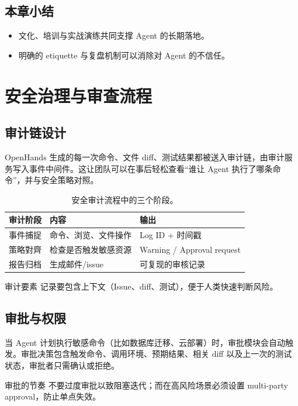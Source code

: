 \documentclass[a4paper]{article}
\begin{document}
\subsection{本章小结}
\begin{itemize}
    \item 文化、培训与实战演练共同支撑 Agent 的长期落地。
    \item 明确的 etiquette 与复盘机制可以消除对 Agent 的不信任。
\end{itemize}

\section{安全治理与审查流程}
\subsection{审计链设计}
OpenHands 生成的每一次命令、文件 diff、测试结果都被送入审计链，由审计服务写入事件中间件。这让团队可以在事后轻松查看“谁让 Agent 执行了哪条命令”，并与安全策略对照。

\begin{table}[H]
\centering
\begin{tabular}{p{} p{} p{}}
\toprule
审计阶段 & 内容 & 输出 \\
\midrule
事件捕捉 & 命令、浏览、文件操作 & Log ID + 时间戳 \\
\midrule
策略對齊 & 检查是否触发敏感资源 & Warning / Approval request \\
\midrule
报告归档 & 生成邮件/issue & 可复现的审核记录 \\
\bottomrule
\end{tabular}
\caption{安全审计流程中的三个阶段。}
\end{table}

\begin{importantbox}{审计要素}
记录要包含上下文（Issue、diff、测试），便于人类快速判断风险。
\end{importantbox}

\subsection{审批与权限}
当 Agent 计划执行敏感命令（比如数据库迁移、云部署）时，审批模块会自动触发。审批决策包含触发命令、调用环境、预期结果、相关 diff 以及上一次的测试状态，审批者只需确认或拒绝。

\begin{warningbox}{审批的节奏}
不要过度审批以致阻塞迭代；而在高风险场景必须设置 multi-party approval，防止单点失效。
\end{warningbox}
\end{document}
